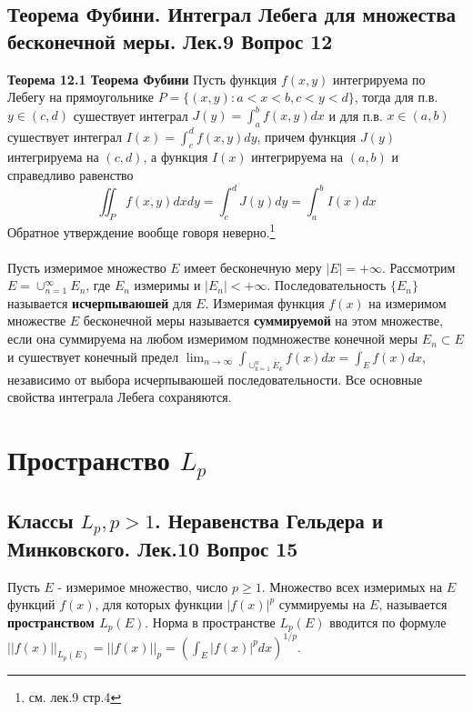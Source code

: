 \documentclass{article}
\begin{document}
\subsection{Теорема Фубини. Интеграл Лебега для множества бесконечной меры. Лек.9 \textbf{Вопрос 12}}
	\textbf{Теорема 12.1 Теорема Фубини} Пусть функция $f(x,y)$  интегрируема по Лебегу на прямоугольнике $P=\{(x,y): a<x<b, c<y<d\}$, тогда для п.в. $y\in (c,d)$ сушествует интеграл $J(y)=\int_{a}^{b} f(x,y)dx$ и для п.в. $x\in (a,b)$ сушествует интеграл $I(x)=   \int_{c}^{d} f(x,y)dy$, причем функция $J(y)$ интегрируема на $(c,d)$, а функция $I(x)$ интегрируема на $(a,b)$ и справедливо равенство
	\begin{equation}
	\iint_{P} f(x,y)dxdy=\int_{c}^{d} J(y)dy=\int_{a}^{b}I(x)dx
	\end{equation}
	Обратное утверждение вообще говоря неверно.\footnote{см. лек.9 стр.4}\\
	\\
	Пусть измеримое множество $E$ имеет бесконечную меру $|E|=+\infty$. Рассмотрим $E=\cup_{n=1}^{\infty} E_{n}$, где $E_{n}$ измеримы и $|{E}_{n}|<+\infty$. Последовательность $\{{E}_{n}\}$ называется \textbf{исчерпываюшей} для $E$. Измеримая функция $f(x)$ на измеримом множестве $E$ бесконечной меры называется \textbf{суммируемой} на этом множестве, если она суммируема на любом измеримом подмножестве конечной меры $E_{n}\subset E$ и сушествует конечный предел $\lim _{n \rightarrow \infty} \int_{\cup_{k=1}^{n} E_{k}} f(x) d x=\int_{E} f(x)dx$, независимо от выбора исчерпываюшей последовательности. Все основные свойства интеграла Лебега сохраняются.
\section{Пространство ${L}_{p}$}	
\subsection{Классы ${L}_{p}, p>1$. Неравенства Гельдера и Минковского. Лек.10 \textbf{Вопрос 15}}
	Пусть $E$ - измеримое множество, число $p\ge 1$. Множество всех измеримых на $E$ функций $f(x)$, для которых
	функции ${|f(x)|}^{p}$ суммируемы на $E$, называется \textbf{пространством ${L}_{p}(E)$}.
	Норма в пространстве ${L}_{p}(E)$ вводится по формуле ${||f(x)||}_{{L}_{p}(E)}={||f(x)||}_{p}={(\int_{E} {|f(x)|}^{p}dx)}^{1/p}$.\\
	
\end{document}
